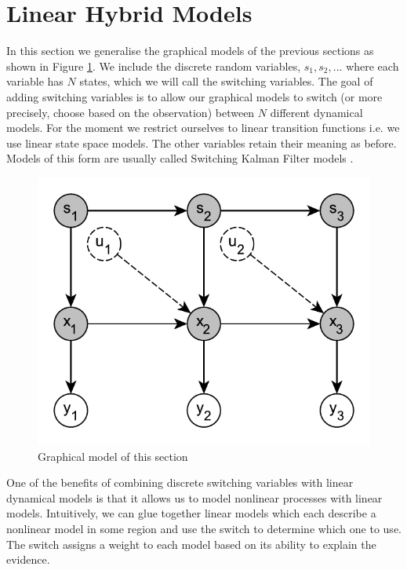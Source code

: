 \documentclass[../masters.tex]{subfiles}
\begin{document}
\graphicspath{{./imgs/}{../imgs/}} %

\section{Linear Hybrid Models}
In this section we generalise the graphical models of the previous sections as shown in Figure \ref{fig_hybridmod1}. We include the discrete random variables, $s_1, s_2,...$ where each variable has $N$ states, which we will call the switching variables. The goal of adding switching variables is to allow our graphical models to switch (or more precisely, choose based on the observation) between $N$ different dynamical models. For the moment we restrict ourselves to linear transition functions i.e. we use linear state space models. The other variables retain their meaning as before. Models of this form are usually called Switching Kalman Filter models \cite{murphy1}. 
\begin{figure}[H] 
\centering
\includegraphics[scale=1.0]{hybrid_model.pdf}
\caption{Graphical model of this section}
\label{fig_hybridmod1}
\end{figure}
One of the benefits of combining discrete switching variables with linear dynamical models is that it allows us to model nonlinear processes with linear models. Intuitively, we can glue together linear models which each describe a nonlinear model in some region and use the switch to determine which one to use. The switch assigns a weight to each model based on its ability to explain the evidence. 
\end{document}
